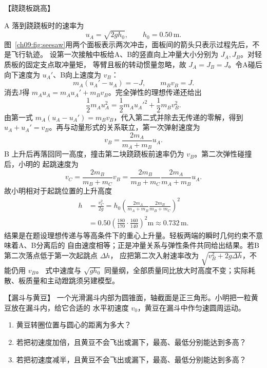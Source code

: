 {\begin{origexamplebox}{【跷跷板跳高】}
\ThQSeesaws
\end{origexamplebox}

\begin{xesolution}
\seesawDiagram

A 落到跷跷板时的速率为
\[
 u_A=\sqrt{2gh_0},\qquad h_0=0.50\,\mathrm m.
\]
图~\ref{ch09:fig:seesaw}用两个面板表示两次冲击，面板间的箭头只表示过程先后，不是飞行轨迹。
设第一次接触中板给A、B的竖直向上冲量大小分别为 $J_A,J_B$。对轻质板的固定支点取冲量矩，
等臂且板的转动惯量忽略，故 $J_A=J_B=J$。令A碰后向下速度为 $u_A'$、B向上速度为 $v_B$：
\[
 m_A(u_A'-u_A)=-J,\qquad m_Bv_B=J.
\]
消去J得 $m_Au_A=m_Au_A'+m_Bv_B$。完全弹性的理想传递还给出
\[
 \frac12m_Au_A^2=\frac12m_Au_A'^2+\frac12m_Bv_B^2.
\]
由第一式 $m_A(u_A-u_A')=m_Bv_B$，代入第二式并除去无传递的零解，得到
$u_A+u_A'=v_B$。再与动量形式的关系联立，第一次弹射速度为
\[
 v_B=\frac{2m_A}{m_A+m_B}u_A.
\]
B 上升后再落回同一高度，撞击第二块跷跷板前速率仍为 $v_B$。第二次弹性碰撞后，小明的
起跳速度为
\[
 v_C=\frac{2m_B}{m_B+m_C}v_B
 =\frac{2m_B}{m_B+m_C}\frac{2m_A}{m_A+m_B}u_A.
\]
故小明相对于起跳位置的上升高度
\begin{align*}
 h&=\frac{v_C^2}{2g}
 =h_0\left(
 \frac{2m_A}{m_A+m_B}
 \frac{2m_B}{m_B+m_C}
 \right)^2\\
 &=0.50\left(\frac{180}{170}\cdot\frac{160}{140}\right)^2\mathrm m
 \approx\boxed{0.732\,\mathrm m}.
\end{align*}
结果是在题设理想传递与等高条件下的重心上升量。轻板两端的瞬时几何约束不意味着A、B分离后的
自由速度相等；正是冲量关系与弹性条件共同给出结果。若B第二次落点低于第一次起跳点 $\Delta h$，
应把第二次入射速率改为 $\sqrt{v_B^2+2g\Delta h}$，不能仍用 $v_B$。
式中速度与 $\sqrt{gh_0}$ 同量纲，全部质量同比放大时高度不变；实际耗散、板质量和主动蹬跳须另建模型。
\end{xesolution}

\begin{origexamplebox}{【漏斗与黄豆】}\label{ch09:ex:s16-14-8}
一个光滑漏斗内部为圆锥面，轴截面是正三角形。小明把一粒黄豆放在漏斗内，给它合适的
水平初速度 $v_0$，黄豆在漏斗中作匀速圆周运动。
\begin{enumerate}[label=(\arabic*),leftmargin=2.2em]
  \item 黄豆转圈位置与圆心的距离为多大？
  \item 若把初速度加倍，且黄豆不会飞出或漏下，最高、最低分别能达到多高？
  \item 若把初速度减半，且黄豆不会飞出或漏下，最高、最低分别能达到多高？
\end{enumerate}



\end{origexamplebox}}
